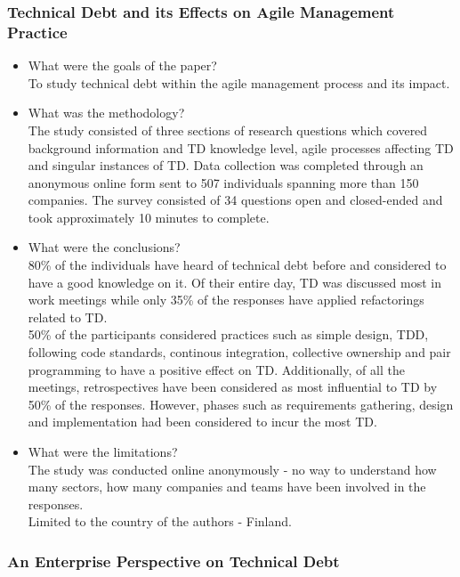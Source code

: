 \documentclass{mprop}
\begin{document}
\subsubsection{Technical Debt and its Effects on Agile Management Practice} \cite{Holvitie2014}
\begin{itemize}
	\item What were the goals of the paper? \\
	      To study technical debt within the agile management process and its impact.
	\item What was the methodology? \\
	      The study consisted of three sections of research questions which covered background information and TD knowledge level, agile processes affecting TD and singular instances of TD.
	      Data collection was completed through an anonymous online form sent to 507 individuals spanning more than 150 companies.
	      The survey consisted of 34 questions open and closed-ended and took approximately 10 minutes to complete.
	\item What were the conclusions? \\
	      80\% of the individuals have heard of technical debt before and considered to have a good knowledge on it.
	      Of their entire day, TD was discussed most in work meetings while only 35\% of the responses have applied refactorings related to TD.\\
	      50\% of the participants considered practices such as simple design, TDD, following code standards, continous integration, collective ownership and pair programming to have a positive effect on TD.
	      Additionally, of all the meetings, retrospectives have been considered as most influential to TD by 50\% of the responses.
	      However, phases such as requirements gathering, design and implementation had been considered to incur the most TD.
	\item What were the limitations? \\
	      The study was conducted online anonymously - no way to understand how many sectors, how many companies and teams have been involved in the responses.\\
	      Limited to the country of the authors - Finland.
\end{itemize}

\subsubsection{An Enterprise Perspective on Technical Debt} \cite{Klinger2011}
\end{document}
